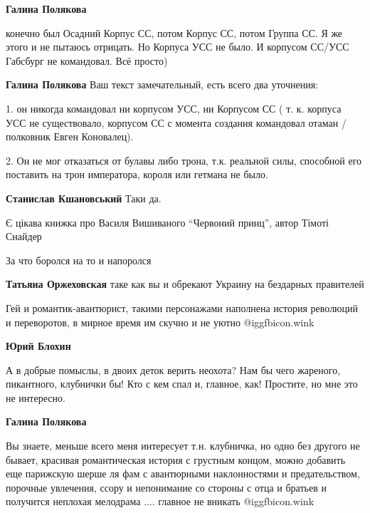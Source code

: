 \begin{itemize}
\begin{itemize}
\begin{itemize}
\textbf{Галина Полякова} 

конечно был Осадний Корпус СС, потом Корпус СС, потом Группа СС. Я же этого и
не пытаюсь отрицать. Но Корпуса УСС не было. И корпусом СС/УСС Габсбург не
командовал. Всё просто)


\textbf{Галина Полякова} Ваш текст замечательный, есть всего два уточнения:

1. он никогда командовал ни корпусом УСС, ни Корпусом СС ( т. к. корпуса УСС не
существовало, корпусом СС с момента создания командовал отаман / полковник
Евген Коновалец).

2. Он не мог отказаться от булавы либо трона, т.к. реальной силы, способной
его поставить на трон императора, короля или гетмана не было.

\end{itemize} %

\textbf{Станислав Кшановський} Таки да.

\end{itemize} %

Є цікава книжка про Василя Вишиваного \enquote{Червоний принц}, автор Тімоті Снайдер

За что боролся на то и напоролся

\begin{itemize} %
\textbf{Татьяна Оржеховская} таке как вы и обрекают Украину на бездарных правителей
\end{itemize} %


Гей и романтик-авантюрист, такими персонажами наполнена история революций и
переворотов, в мирное время им скучно и не уютно  @igg{fbicon.wink} 

\begin{itemize} %
\textbf{Юрий Блохин} 

А в добрые помыслы, в двоих деток верить неохота? Нам бы чего жареного,
пикантного, клубнички бы! Кто с кем спал и, главное, как! Простите, но мне это
не интересно.


\textbf{Галина Полякова} 

Вы знаете, меньше всего меня интересует т.н. клубничка, но одно без другого не
бывает, красивая романтическая история с грустным концом, можно добавить еще
парижскую шерше ля фам с авантюрными наклонностями и предательством, порочные
увлечения, ссору и непонимание со стороны с отца и братьев и получится
неплохая мелодрама .... главное не вникать  @igg{fbicon.wink} 


\end{itemize}
\end{itemize}
